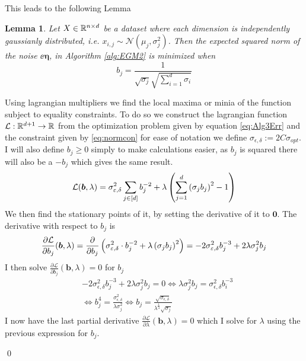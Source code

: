 \documentclass[a4paper,12pt]{article}
\renewenvironment{proof}{{\textit{Proof} \\}}{\qed}
\newtheorem{lemma}{Lemma}[section]
\begin{document}
\noindent This leads to the following Lemma

\begin{lemma}
\label{lem:Optb}
Let $X \in \mathbb{R}^{n \times d}$ be a dataset where each dimension is independently gaussianly distributed, i.e.
$x_{i,j} \sim \mathcal{N}(\mu_j, \sigma_j^2)$.
Then the expected squared norm of the noise $\ee{\bm{\eta}}$, 
in Algorithm \ref{alg:EGM2} is minimized when
\[
    b_j = \frac{1}{\sqrt{\sigma_j} \sqrt{\sum_{i=1}^d \sigma_i}}
\]
\end{lemma}
\begin{proof}
Using lagrangian multipliers we find the local maxima or 
minia of the function subject to equality constraints.
To do so we construct the lagrangian function $\mathcal{L}: \mathbb{R}^{d+1} \rightarrow \mathbb{R}$ from the optimization problem given by
equation \eqref{eq:Alg3Err} and the constraint given by \eqref{eq:normcon} for ease of notation we define 
$\sigma_{\epsilon, \delta} := 2C\sigma_{opt}$. 
I will also define $b_j \ge 0$ simply to make calculations easier, 
as $b_j$ is squared there will also be a $-b_j$ which gives the same result.
\[
    \mathcal{L}(\bm{b},\lambda) = \sigma_{\varepsilon,\delta}^2\sum_{j \in [d]} b_j^{-2}
    + \lambda \left ( \sum_{j=1}^d \left (\sigma_j b_j\right)^2 - 1\right)
\]
We then find the stationary points of it,
by setting the derivative of it to $\bm{0}$.
The derivative with respect to $b_j$ is 
\[
    \frac{\partial \mathcal{L}}{\partial b_j} (\bm{b}, \lambda)= 
    \frac{\partial}{\partial b_j} \left (\sigma_{\varepsilon,\delta}^2 \cdot b_j^{-2}
    + \lambda \left (\sigma_j b_j\right)^2\right) =
    -2 \sigma_{\varepsilon,\delta}^2 b_j^{-3} + 2 \lambda \sigma_j^2b_j
\]
I then solve $\frac{\partial \mathcal{L}}{\partial b_j}(\bm{b},\lambda) = 0$ for $b_j$
\begin{align}
    &-2\sigma_{\epsilon,\delta}^2 b_j^{-3} + 2 \lambda \sigma_j^2b_j = 0 \iff
    \lambda \sigma_j^2b_j = \sigma_{\epsilon,\delta}^2 b_i^{-3}  \\
\label{eq:solvbi}
    &\iff b_j^4 = \frac{\sigma_{\epsilon,\delta}^2}{\lambda \sigma_j^2} \iff 
    b_j = \frac{\sqrt{\sigma_{\epsilon,\delta}}}{\lambda^{\frac{1}{4}} \sqrt{\sigma_j}} 
\end{align}
I now have the last partial derivative 
$\frac{\partial \mathcal{L}}{\partial \lambda}(\bm{b},\lambda) = 0$ which I solve for
$\lambda$ using the previous expression for $b_j$.


\end{proof}
\end{document}
